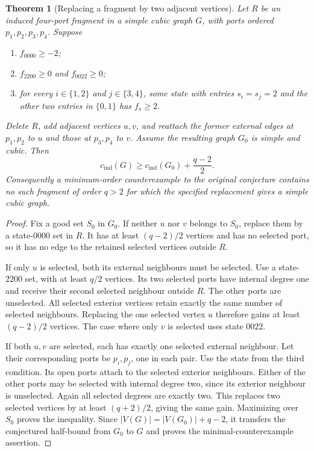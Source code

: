 \documentclass[11pt]{article}
\newtheorem{theorem}{Theorem}[section]
\newcommand{\cind}{c_{\mathrm{ind}}}
\begin{document}
\begin{theorem}[Replacing a fragment by two adjacent vertices]
\label{thm:four-port-contraction}
Let $R$ be an induced four-port fragment in a simple cubic graph $G$,
with ports ordered $p_1,p_2,p_3,p_4$. Suppose
\begin{enumerate}
\item $f_{0000}\geq-2$;
\item $f_{2200}\geq0$ and $f_{0022}\geq0$;
\item for every $i\in\{1,2\}$ and $j\in\{3,4\}$, some state with
entries $s_i=s_j=2$ and the other two entries in $\{0,1\}$ has
$f_s\geq2$.
\end{enumerate}
Delete $R$, add adjacent vertices $u,v$, and reattach the former
external edges at $p_1,p_2$ to $u$ and those at $p_3,p_4$ to $v$.
Assume the resulting graph $G_0$ is simple and cubic. Then
\[
 \cind(G)\geq\cind(G_0)+\frac{q-2}{2}.
\]
Consequently a minimum-order counterexample to the original
conjecture contains no such fragment of order $q>2$ for which the
specified replacement gives a simple cubic graph.
\end{theorem}
\begin{proof}
Fix a good set $S_0$ in $G_0$. If neither $u$ nor $v$ belongs to
$S_0$, replace them by a state-$0000$ set in $R$. It has at least
$(q-2)/2$ vertices and has no selected port, so it has no edge to
the retained selected vertices outside $R$.

If only $u$ is selected, both its external neighbours must be
selected. Use a state-$2200$ set, with at least $q/2$ vertices.
Its two selected ports have internal degree one and receive their
second selected neighbour outside $R$. The other ports are
unselected. All selected exterior vertices retain exactly the
same number of selected neighbours. Replacing the one selected
vertex $u$ therefore gains at least $(q-2)/2$ vertices. The case
where only $v$ is selected uses state $0022$.

If both $u,v$ are selected, each has exactly one selected external
neighbour. Let their corresponding ports be $p_i,p_j$, one in each
pair. Use the state from the third condition. Its open ports attach
to the selected exterior neighbours. Either of the other ports may
be selected with internal degree two, since its exterior neighbour
is unselected. Again all selected degrees are exactly two. This
replaces two selected vertices by at least $(q+2)/2$, giving the
same gain. Maximizing over $S_0$ proves the inequality. Since
$|V(G)|=|V(G_0)|+q-2$, it transfers the conjectured half-bound
from $G_0$ to $G$ and proves the minimal-counterexample assertion.
\end{proof}
\end{document}
